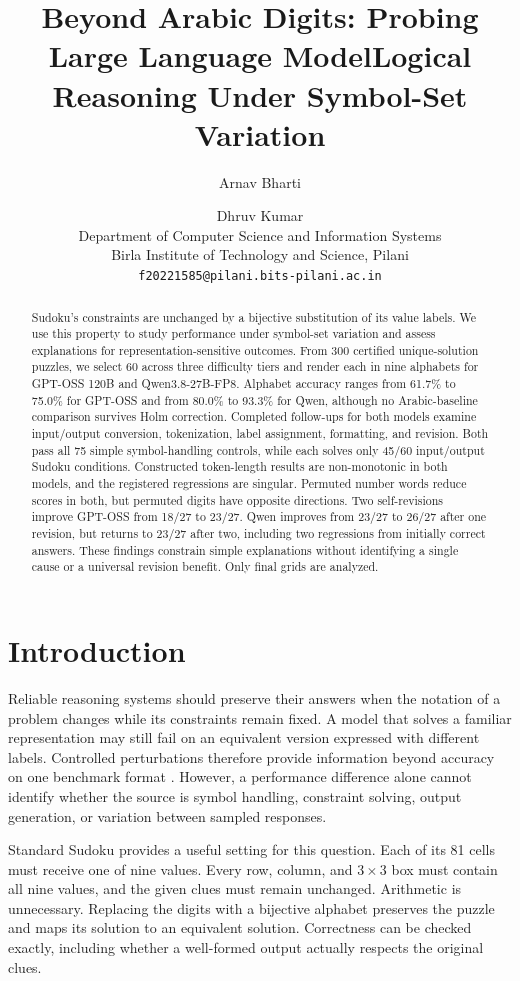 \documentclass[11pt]{article}
\title{Beyond Arabic Digits: Probing Large Language Model\newline Logical Reasoning Under Symbol-Set Variation}
\author{Arnav Bharti \and Dhruv Kumar \\
 Department of Computer Science and Information Systems \\
 Birla Institute of Technology and Science, Pilani \\
 \texttt{f20221585@pilani.bits-pilani.ac.in}}
\begin{document}
\maketitle

\begin{abstract}
Sudoku's constraints are unchanged by a bijective substitution of its value labels. We use this property to study performance under symbol-set variation and assess explanations for representation-sensitive outcomes. From 300 certified unique-solution puzzles, we select 60 across three difficulty tiers and render each in nine alphabets for GPT-OSS 120B and Qwen3.8-27B-FP8. Alphabet accuracy ranges from 61.7\% to 75.0\% for GPT-OSS and from 80.0\% to 93.3\% for Qwen, although no Arabic-baseline comparison survives Holm correction. Completed follow-ups for both models examine input/output conversion, tokenization, label assignment, formatting, and revision. Both pass all 75 simple symbol-handling controls, while each solves only 45/60 input/output Sudoku conditions. Constructed token-length results are non-monotonic in both models, and the registered regressions are singular. Permuted number words reduce scores in both, but permuted digits have opposite directions. Two self-revisions improve GPT-OSS from 18/27 to 23/27. Qwen improves from 23/27 to 26/27 after one revision, but returns to 23/27 after two, including two regressions from initially correct answers. These findings constrain simple explanations without identifying a single cause or a universal revision benefit. Only final grids are analyzed.
\end{abstract}

\section{Introduction}
Reliable reasoning systems should preserve their answers when the notation of a problem changes while its constraints remain fixed. A model that solves a familiar representation may still fail on an equivalent version expressed with different labels. Controlled perturbations therefore provide information beyond accuracy on one benchmark format \citep{mirzadeh2025gsmsymbolic,wei2023symbol}. However, a performance difference alone cannot identify whether the source is symbol handling, constraint solving, output generation, or variation between sampled responses.

Standard Sudoku provides a useful setting for this question. Each of its 81 cells must receive one of nine values. Every row, column, and $3\times3$ box must contain all nine values, and the given clues must remain unchanged. Arithmetic is unnecessary. Replacing the digits with a bijective alphabet preserves the puzzle and maps its solution to an equivalent solution. Correctness can be checked exactly, including whether a well-formed output actually respects the original clues.
\end{document}
